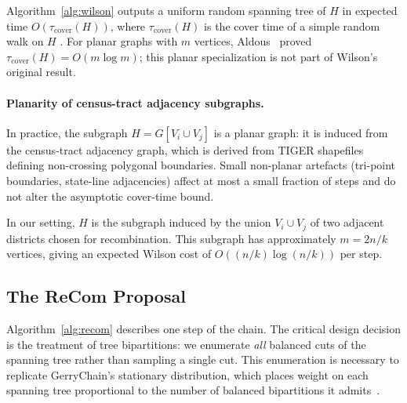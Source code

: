 \begin{theorem}
Algorithm~\ref{alg:wilson} outputs a uniform random spanning tree of $H$
in expected time $O(\tau_{\mathrm{cover}}(H))$, where $\tau_{\mathrm{cover}}(H)$
is the cover time of a simple random walk on $H$ \citep{wilson1996generating}.
For planar graphs with $m$ vertices, Aldous~\citeyearpar{aldous1991random}
proved $\tau_{\mathrm{cover}}(H) = O(m \log m)$; this planar specialization
is not part of Wilson's original result.
\end{theorem}

\paragraph{Planarity of census-tract adjacency subgraphs.}
In practice, the subgraph $H = G[V_i \cup V_j]$ is a planar graph: it is induced from the census-tract adjacency graph, which is derived from TIGER shapefiles defining non-crossing polygonal boundaries.
Small non-planar artefacts (tri-point boundaries, state-line adjacencies) affect at most a small fraction of steps and do not alter the asymptotic cover-time bound.

In our setting, $H$ is the subgraph induced by the union $V_i \cup V_j$
of two adjacent districts chosen for recombination.
This subgraph has approximately $m = 2n/k$ vertices, giving an expected
Wilson cost of $O((n/k)\log(n/k))$ per \recom{} step.

\subsection{The ReCom Proposal}

Algorithm~\ref{alg:recom} describes one step of the \recom{} chain.
The critical design decision is the treatment of tree bipartitions:
we enumerate \emph{all} balanced cuts of the spanning tree rather than
sampling a single cut.
This enumeration is necessary to replicate GerryChain's stationary
distribution, which places weight on each spanning tree proportional
to the number of balanced bipartitions it admits~\citep{deford2021recombination}.

